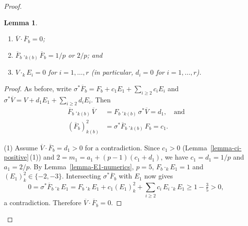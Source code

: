 \documentclass[reqno,oneside]{amsart}
\newtheorem{lemma}[theorem]{Lemma}
\theoremstyle{definition}
\theoremstyle{plain}
\numberwithin{equation}{section}
\begin{document}
\begin{proof}
\begin{lemma}\label{lemma-classification} 
  \begin{enumerate}[\rm(1)]
    \item $\overline{V}\cdot \overline{F}_b =0$;
    \item $\overline{F}_b\cdot_{k(b)} \overline{F}_b = 1/p $ or $2/p$; and
    \item $V\cdot_k E_i = 0$ for $i=1,\ldots,r$ (in particular, $d_i = 0$ for $i=1,\ldots,r$).
  \end{enumerate}
\end{lemma}
\begin{proof}
  As before, write $\sigma^*\overline{F}_b = F_b + c_1E_1 + \sum_{i\geq 2} c_i E_i$ and $\sigma^*\overline{V} = V+ d_1E_1 + \sum_{i\geq 2} d_i E_i$.
  Then
  \begin{equation}\label{equation-4-prime}
  \begin{aligned}
    \overline{F}_b\cdot_{k(b)} \overline{V} &= F_b\cdot_{k(b)} \sigma^*\overline{V}=
      d_1, \quad\text{and}\\
      (\overline{F}_b)^2_{k(b)} &= \sigma^*\overline{F}_b\cdot_{k(b)} F_b = c_1 .
  \end{aligned}
  \end{equation}

  (1) Assume $\overline{V}\cdot \overline{F}_b = d_1 > 0$ for a contradiction. 
  Since $c_1>0$ (Lemma~\ref{lemma-ci-positive}\,(1)) and $2 = m_1 = a_1 + (p-1)(c_1 + d_1)$, we have $c_1=d_1=1/p$ and $a_1 = 2/p$.
  By Lemma~\ref{lemma-E1-numerics}, $p=5$, $F_b\cdot_k E_1=1$ and $(E_1)^2_k\in \{-2,-3\}$.
  Intersecting $\sigma^*\overline F_b$ with $E_1$ now gives
  \[
    0=\sigma^*\overline F_b\cdot_k E_1 = F_b\cdot_k E_1 + c_1(E_1)^2_k + \sum_{i\geq 2}
    c_i\,E_i\cdot_k E_1 \geq 1 - \tfrac{3}{5} > 0,
  \]
  a contradiction. Therefore $\overline{V}\cdot \overline{F}_b = 0$.


\end{proof}
\end{proof}
\end{document}
